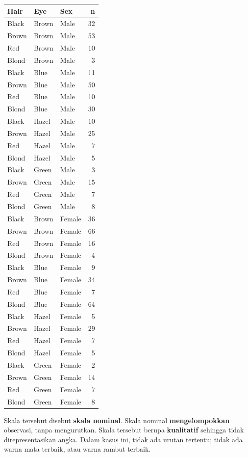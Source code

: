 \documentclass[
  letterpaper,
  DIV=11,
  numbers=noendperiod]{scrreprt}
\begin{document}
\begin{longtable}[]{@{}lllr@{}}
\toprule()
Hair & Eye & Sex & n \\
\midrule()
\endhead
Black & Brown & Male & 32 \\
Brown & Brown & Male & 53 \\
Red & Brown & Male & 10 \\
Blond & Brown & Male & 3 \\
Black & Blue & Male & 11 \\
Brown & Blue & Male & 50 \\
Red & Blue & Male & 10 \\
Blond & Blue & Male & 30 \\
Black & Hazel & Male & 10 \\
Brown & Hazel & Male & 25 \\
Red & Hazel & Male & 7 \\
Blond & Hazel & Male & 5 \\
Black & Green & Male & 3 \\
Brown & Green & Male & 15 \\
Red & Green & Male & 7 \\
Blond & Green & Male & 8 \\
Black & Brown & Female & 36 \\
Brown & Brown & Female & 66 \\
Red & Brown & Female & 16 \\
Blond & Brown & Female & 4 \\
Black & Blue & Female & 9 \\
Brown & Blue & Female & 34 \\
Red & Blue & Female & 7 \\
Blond & Blue & Female & 64 \\
Black & Hazel & Female & 5 \\
Brown & Hazel & Female & 29 \\
Red & Hazel & Female & 7 \\
Blond & Hazel & Female & 5 \\
Black & Green & Female & 2 \\
Brown & Green & Female & 14 \\
Red & Green & Female & 7 \\
Blond & Green & Female & 8 \\
\bottomrule()
\end{longtable}

Skala tersebut disebut \textbf{skala nominal}. Skala nominal
\textbf{mengelompokkan} observasi, tanpa mengurutkan. Skala tersebut
berupa \textbf{kualitatif} sehingga tidak direpresentasikan angka. Dalam
kasus ini, tidak ada urutan tertentu; tidak ada warna mata terbaik, atau
warna rambut terbaik.
\end{document}
